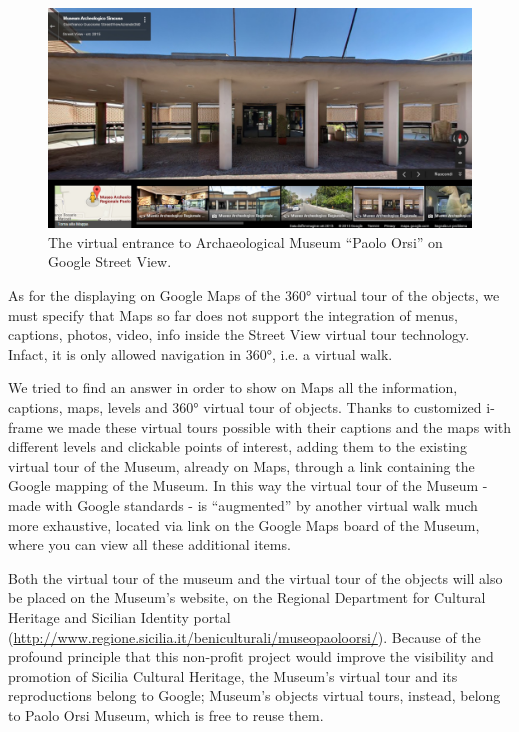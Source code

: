 \documentclass[amsthm,ebook]{saparticle}
\begin{document}
\begin{figure}[!bp]
\centering
 \includegraphics[width=\columnwidth]{EAGLE2016BONACINIPilotprojectatPaoloOrsiMuseum-img001.jpg}
\caption{The virtual entrance to Archaeological Museum ``Paolo Orsi'' on Google Street View. }
\label{fig:1}
\end{figure}


As for the displaying on Google Maps of the 360° virtual tour of the objects, we must specify that Maps so far does not
support the integration of menus, captions, photos, video, info inside the Street View virtual tour technology.
Infact, it is only allowed navigation in 360°, i.e. a virtual walk.

We tried to find an answer in order to show on Maps all the information, captions, maps, levels and 360° virtual tour of
objects. Thanks to customized i-frame we made these virtual tours possible with their captions and the maps with
different levels and clickable points of interest, adding them to the existing virtual tour of the Museum, already on
Maps, through a link containing the Google mapping of the Museum. In this way the virtual tour of the Museum - made
with Google standards - is ``augmented'' by another virtual walk much more exhaustive, located via link on the Google
Maps board of the Museum, where you can view all these additional items.

Both the virtual tour of the museum and the virtual tour of the objects will also be placed on the Museum's website, on
the Regional Department for Cultural Heritage and Sicilian Identity portal
(\url{http://www.regione.sicilia.it/beniculturali/museopaoloorsi/}). Because of the profound principle that this non-profit
project would improve the visibility and promotion of Sicilia Cultural Heritage, the Museum’s virtual tour and its
reproductions belong to Google; Museum’s objects virtual tours, instead, belong to Paolo Orsi Museum, which is free to
reuse them. 
\end{document}
